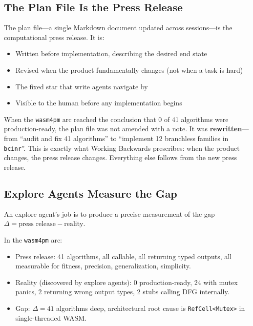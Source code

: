\documentclass[11pt,a4paper]{article}
\newcommand{\code}[1]{\texttt{#1}}
\newcommand{\gap}{\Delta}
\begin{document}
\subsection{The Plan File Is the Press Release}

The plan file---a single Markdown document updated across sessions---is the
computational press release.  It is:

\begin{itemize}
  \item Written before implementation, describing the desired end state
  \item Revised when the product fundamentally changes (not when a task is hard)
  \item The fixed star that write agents navigate by
  \item Visible to the human before any implementation begins
\end{itemize}

When the \code{wasm4pm} arc reached the conclusion that 0 of 41 algorithms were
production-ready, the plan file was not amended with a note.  It was
\textbf{rewritten}---from ``audit and fix 41 algorithms'' to ``implement 12
branchless families in \code{bcinr}''.  This is exactly what Working Backwards
prescribes: when the product changes, the press release changes.  Everything
else follows from the new press release.

\subsection{Explore Agents Measure the Gap}

An explore agent's job is to produce a precise measurement of the gap
$\gap = \text{press release} - \text{reality}$.

In the \code{wasm4pm} arc:

\begin{itemize}
  \item Press release: 41 algorithms, all callable, all returning typed outputs,
    all measurable for fitness, precision, generalization, simplicity.
  \item Reality (discovered by explore agents): 0 production-ready, 24 with
    mutex panics, 2 returning wrong output types, 2 stubs calling DFG
    internally.
  \item Gap: $\gap = 41$ algorithms deep, architectural root cause is
    \code{RefCell<Mutex>} in single-threaded WASM.
\end{itemize}
\end{document}
